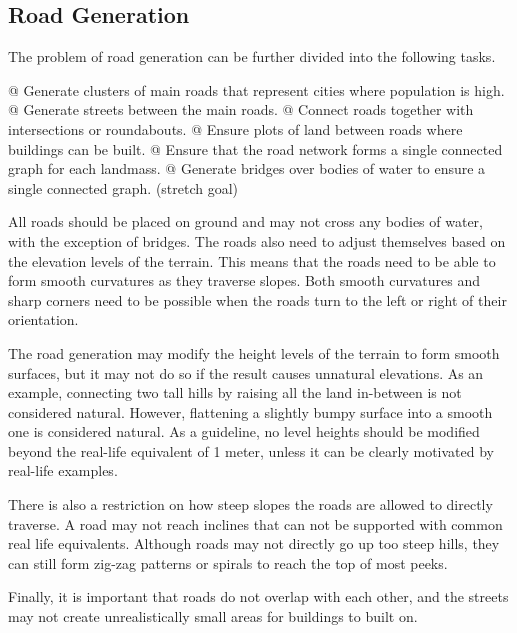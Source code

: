 \subsection{Road Generation}

The problem of road generation can be further divided into the following tasks.

\begin{easylist}
  @ Generate clusters of main roads that represent cities where population is high.
  @ Generate streets between the main roads.
  @ Connect roads together with intersections or roundabouts.
  @ Ensure plots of land between roads where buildings can be built.
  @ Ensure that the road network forms a single connected graph for each landmass.
  @ Generate bridges over bodies of water to ensure a single connected graph. (stretch goal)
\end{easylist}

All roads should be placed on ground and may not cross any bodies of water, with the exception of bridges.
The roads also need to adjust themselves based on the elevation levels of the terrain.
This means that the roads need to be able to form smooth curvatures as they traverse slopes.
Both smooth curvatures and sharp corners need to be possible when the roads turn to the left or right of their orientation.

The road generation may modify the height levels of the terrain to form smooth surfaces, but it may not do so if the result causes unnatural elevations.
As an example, connecting two tall hills by raising all the land in-between is not considered natural.
However, flattening a slightly bumpy surface into a smooth one is considered natural.
As a guideline, no level heights should be modified beyond the real-life equivalent of 1 meter, unless it can be clearly motivated by real-life examples.

There is also a restriction on how steep slopes the roads are allowed to directly traverse.
A road may not reach inclines that can not be supported with common real life equivalents.
Although roads may not directly go up too steep hills, they can still form zig-zag patterns or spirals to reach the top of most peeks.

Finally, it is important that roads do not overlap with each other, and the streets may not create unrealistically small areas for buildings to built on.
